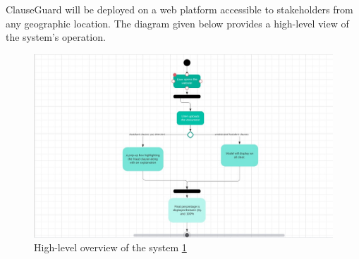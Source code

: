 ClauseGuard will be deployed on a web platform accessible to stakeholders from any geographic location. The diagram given below provides a high-level view of the system's operation.

\begin{figure}[h]
\centering
\includegraphics[scale=0.93]{Figures/activity diagram.jpg}
\caption{High-level overview of the system \ref{fig:system_overview}}
\label{fig:system_overview}
\end{figure}



